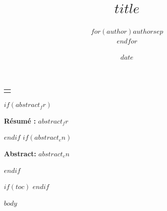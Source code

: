 \documentclass[11pt]{article}
\title{$title$}
\author{$for(author)$$author$$sep$ \\ $endfor$}
\date{$date$}
\makeatletter
\renewcommand{\maketitle}{
  \begin{center}
  \vspace*{1cm}
  {\fontsize{18}{24}\selectfont \textbf{\@title} \par}
  \vspace{1cm}
  {\Large
  \begin{tabular}[t]{c}
  \@author
  \end{tabular}\par}
  \vspace{1cm}
  {\Large \@date \par}
  \end{center}
  \vspace{1cm}
}
\makeatother
\begin{document}
\maketitle
\thispagestyle{firstpage}

$if(abstract_fr)$
\begin{center}
\begin{minipage}{0.85\textwidth}
\noindent \textbf{Résumé :} $abstract_fr$
\end{minipage}
\end{center}
\vspace{0.5cm}
$endif$
$if(abstract_en)$
\begin{center}
\begin{minipage}{0.85\textwidth}
\noindent \textbf{Abstract:} $abstract_en$
\end{minipage}
\end{center}
\vspace{1cm}
$endif$


$if(toc)$
\tableofcontents
\clearpage        %
$endif$

\clearpage
\pagestyle{fancy}

$body$
\end{document}
